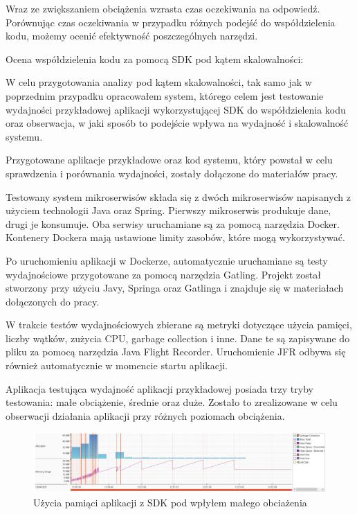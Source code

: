 \documentclass[runningheads,12pt]{llncs}
\begin{document}
\newpage

Wraz ze zwiększaniem obciążenia wzrasta czas oczekiwania na odpowiedź. Porównując czas oczekiwania w przypadku różnych podejść do współdzielenia kodu, możemy ocenić efektywność poszczególnych narzędzi.


Ocena współdzielenia kodu za pomocą SDK pod kątem skalowalności:

W celu przygotowania analizy pod kątem skalowalności, tak samo jak w poprzednim przypadku opracowałem system, którego celem jest testowanie wydajności przykładowej aplikacji wykorzystującej SDK do współdzielenia kodu oraz obserwacja, w jaki sposób to podejście wpływa na wydajność i skalowalność systemu.

Przygotowane aplikacje przykładowe oraz kod systemu, który powstał w celu sprawdzenia i porównania wydajności, zostały dołączone do materiałów pracy.

Testowany system mikroserwisów składa się z dwóch mikroserwisów napisanych z użyciem technologii Java oraz Spring. Pierwszy mikroserwis produkuje dane, drugi je konsumuje. Oba serwisy uruchamiane są za pomocą narzędzia Docker. Kontenery Dockera mają ustawione limity zasobów, które mogą wykorzystywać.

Po uruchomieniu aplikacji w Dockerze, automatycznie uruchamiane są testy wydajnościowe przygotowane za pomocą narzędzia Gatling. Projekt został stworzony przy użyciu Javy, Springa oraz Gatlinga i znajduje się w materiałach dołączonych do pracy.

W trakcie testów wydajnościowych zbierane są metryki dotyczące użycia pamięci, liczby wątków, zużycia CPU, garbage collection i inne. Dane te są zapisywane do pliku za pomocą narzędzia Java Flight Recorder. Uruchomienie JFR odbywa się również automatycznie w momencie startu aplikacji.

Aplikacja testująca wydajność aplikacji przykładowej posiada trzy tryby testowania: małe obciążenie, średnie oraz duże. Zostało to zrealizowane w celu obserwacji działania aplikacji przy różnych poziomach obciążenia.

\newpage


\begin{figure}
    \includegraphics[width=\linewidth]{images/library-memory-low-graph.jpg}
    \caption{Użycia pamiąci aplikacji z SDK pod wpłyłem małego obciażenia} \label{fig1}
\end{figure}
\end{document}
